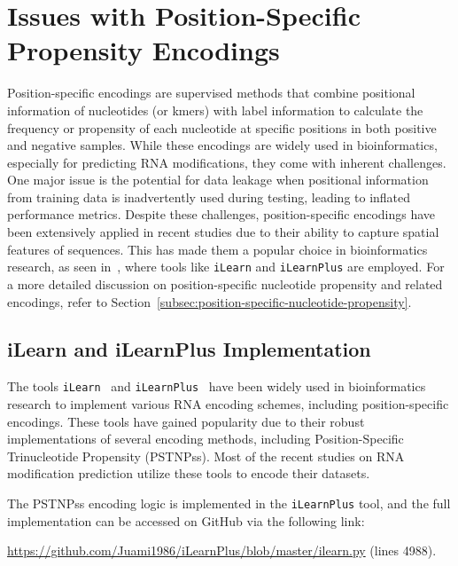 \section{Issues with Position-Specific Propensity Encodings}\label{sec:issues-with-position-specific-propensity-encodings}

  Position-specific encodings are supervised methods that combine positional information of nucleotides (or kmers) with label information to calculate the frequency or propensity of each nucleotide at specific positions in both positive and negative samples.
  While these encodings are widely used in bioinformatics, especially for predicting RNA modifications, they come with inherent challenges.
  One major issue is the potential for data leakage when positional information from training data is inadvertently used during testing, leading to inflated performance metrics.
  Despite these challenges, position-specific encodings have been extensively applied in recent studies due to their ability to capture spatial features of sequences.
  This has made them a popular choice in bioinformatics research, as seen in~\cite{li_porpoise_2021, zhang_pseu-st_2023, chen_fuzzy_2024}, where tools like \texttt{iLearn} and \texttt{iLearnPlus} are employed.
  For a more detailed discussion on position-specific nucleotide propensity and related encodings, refer to Section~\ref{subsec:position-specific-nucleotide-propensity}.

  \subsection{iLearn and iLearnPlus Implementation}\label{subsec:ilearn-and-ilearnplus-implementation}

    The tools \texttt{iLearn}~\cite{chen_ilearn_2020} and \texttt{iLearnPlus}~\cite{chen_ilearnplus_2021} have been widely used in bioinformatics research to implement various RNA encoding schemes, including position-specific encodings.
    These tools have gained popularity due to their robust implementations of several encoding methods, including Position-Specific Trinucleotide Propensity (PSTNPss).
    Most of the recent studies on RNA modification prediction utilize these tools to encode their datasets.

    The PSTNPss encoding logic is implemented in the \texttt{iLearnPlus} tool, and the full implementation can be accessed on GitHub via the following link:

    \url{https://github.com/Juami1986/iLearnPlus/blob/master/ilearn.py} (lines 4988).


